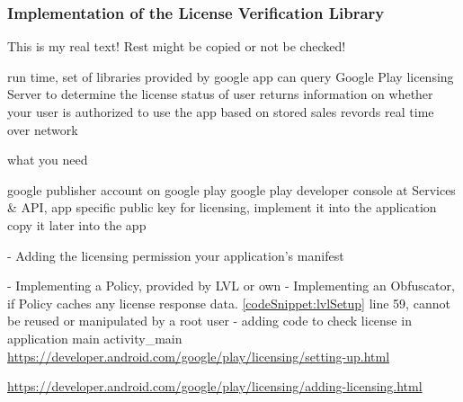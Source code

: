 \subsubsection{Implementation of the License Verification Library}\label{subsection:license-google-implementation}
This is my real text! Rest might be copied or not be checked!



%
run time, set of libraries provided by google
app can query Google Play licensing Server to determine the license status of user
returns information on whether your user is authorized to use the app based on stored sales revords
real time over network
\cite{developersLicensingBlog}
%

%
what you need

google publisher account on google play
google play developer console at Services \& API, app specific public key for licensing, implement it into the application
copy it later into the app

\cite{developersLicensingAdding}
%

%
- Adding the licensing permission your application's manifest


- Implementing a Policy, provided by LVL or own
- Implementing an Obfuscator, if Policy caches any license response data. \ref{codeSnippet:lvlSetup} line 59, cannot be reused or manipulated by a root user
- adding code to check license in application main activity\_main
\cite{developersLicensingAdding}
%
\url{https://developer.android.com/google/play/licensing/setting-up.html}

\url{https://developer.android.com/google/play/licensing/adding-licensing.html}





